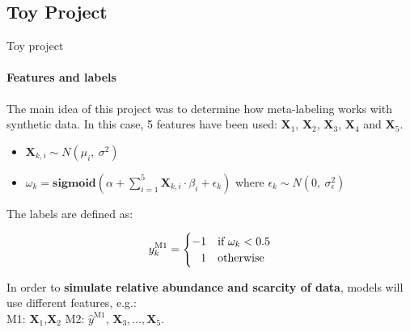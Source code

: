 \documentclass{beamer} %
\begin{document}
\subsection{Toy Project}
\begin{frame}{Toy project}
	\framesubtitle{Features and labels}
	The main idea of this project was to determine how meta-labeling 
	works with synthetic data. In this case, 5 features have been 
	used: $\textbf{X}_1$, $\textbf{X}_2$, $\textbf{X}_3$, $\textbf{X}_4$ and 
	$\textbf{X}_5$.\\
	
	\begin{itemize}
		\item $\textbf{X}_{k, i} \sim N(\mu_i,\ \sigma^2)$
		
		\item $\omega_k = \textbf{sigmoid} \left( \alpha + 
		\sum_{i = 1}^{5} \textbf{X}_{k,i} \cdot \beta_i + \epsilon_k 
		\right)$ where $\epsilon_k \sim N(0,\ \sigma_{\epsilon}^2)$
	\end{itemize}
	
	\vspace{.2cm}
	
	The labels are defined as:

	\begin{equation*}
		y_k^{\text{M1}} =
	    \begin{cases}
	      -1 & \text{if}\ \omega_k < 0.5 \\
	      \hfill 1 & \text{otherwise} 
	    \end{cases}
	\end{equation*}
	
	In order to \textbf{simulate relative abundance and scarcity of data}, 
	models will use different features, e.g.:\\ 
	M1: $\textbf{X}_1$,$\textbf{X}_2$ \hspace{.25cm} M2: 
	$\widehat{y}^{\text{M1}}$, $\textbf{X}_3, \ldots , \textbf{X}_5$. 
	
\end{frame}
\end{document}
